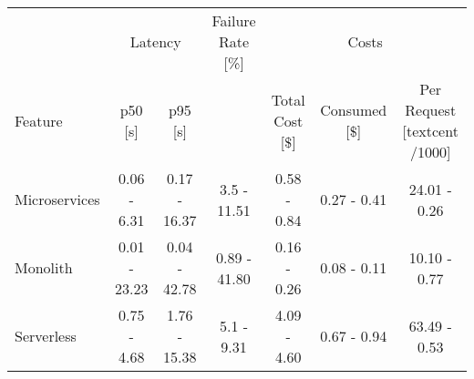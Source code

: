 \begin{tabular}{lcccccc}
\toprule
 & \multicolumn{2}{c}{Latency} & Failure Rate [\%]  & \multicolumn{3}{c}{Costs} \\
Feature & p50 [s] & p95 [s] &  & Total Cost [$\$$] & Consumed [$\$$] & Per Request [textcent /1000] \\
\midrule
Microservices & 0.06 - 6.31 & 0.17 - 16.37 & 3.5 - 11.51 & 0.58 - 0.84 & 0.27 - 0.41 & 24.01 - 0.26 \\
Monolith & 0.01 - 23.23 & 0.04 - 42.78 & 0.89 - 41.80 & 0.16 - 0.26 & 0.08 - 0.11 & 10.10 - 0.77 \\
Serverless & 0.75 - 4.68 & 1.76 - 15.38 & 5.1 - 9.31 & 4.09 - 4.60 & 0.67 - 0.94 & 63.49 - 0.53 \\
\bottomrule
\end{tabular}
